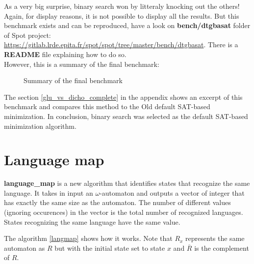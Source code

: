 \noindent As a very big surprise, binary search won by litteraly knocking out the others! Again, for display
reasons, it is not possible to display all the results. But this benchmark exists and can be
reproduced, have a look on \textbf{bench/dtgbasat} folder of Spot project:
\url{https://gitlab.lrde.epita.fr/spot/spot/tree/master/bench/dtgbasat}. There is a \textbf{README} file
explaining how to do so.\\

However, this is a summary of the final benchmark:
\begin{figure}[H]
 \centering
 
 \caption{Summary of the final benchmark}
 \label{fig:final_bench_resume}
\end{figure}

\noindent The section \ref{glu_vs_dicho_complete} in the appendix shows an excerpt of this benchmark and
compares this method to the Old default SAT-based minimization. In conclusion, binary search was selected
as the default SAT-based minimization algorithm.

\section{Language map}
\textbf{language\_map} is a new algorithm that identifies states that recognize the same language.
It takes in input an $\omega$-automaton and outputs a vector of integer that has exactly the same
size as the automaton. The number of different values (ignoring occurences) in the vector is the
total number of recognized languages. States recognizing the same language have the same value.\\
\newcommand{\stcomp}[1]{\overline{#1}}
\begin{algorithm}[h]
 \caption{}
 \label{langmap}
 \begin{algorithmic}[1]
     \If{$R_i \cap \stcomp{R_j} \neq \emptyset \land \stcomp{R_i} \cap R_j \neq \emptyset$}
     \EndIf
    \EndFor
   \EndFor
  \EndProcedure
 \end{algorithmic}
\end{algorithm}
\noindent The algorithm \ref{langmap} shows how it works. Note that $R_x$ represents the same automaton as $R$ but
with the initial state set to state $x$ and $\stcomp{R}$ is the complement of $R$.\\

